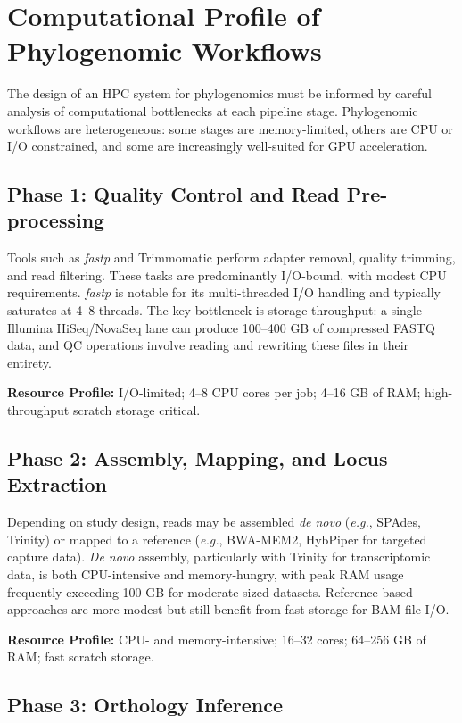 \section{Computational Profile of Phylogenomic Workflows}

The design of an HPC system for phylogenomics must be informed by careful analysis of computational bottlenecks at each pipeline stage. Phylogenomic workflows are heterogeneous: some stages are memory-limited, others are CPU or I/O constrained, and some are increasingly well-suited for GPU acceleration.

\subsection{Phase 1: Quality Control and Read Pre-processing}

Tools such as \textit{fastp} \parencite{chen2018} and Trimmomatic \parencite{bolger2014} perform adapter removal, quality trimming, and read filtering. These tasks are predominantly I/O-bound, with modest CPU requirements. \textit{fastp} is notable for its multi-threaded I/O handling and typically saturates at 4--8 threads. The key bottleneck is storage throughput: a single Illumina HiSeq/NovaSeq lane can produce 100--400 GB of compressed FASTQ data, and QC operations involve reading and rewriting these files in their entirety.

\textbf{Resource Profile:} I/O-limited; 4--8 CPU cores per job; 4--16 GB of RAM; high-throughput scratch storage critical.

\subsection{Phase 2: Assembly, Mapping, and Locus Extraction}

Depending on study design, reads may be assembled \textit{de novo} (\textit{e.g.}, SPAdes, Trinity) or mapped to a reference (\textit{e.g.}, BWA-MEM2, HybPiper for targeted capture data). \textit{De novo} assembly, particularly with Trinity for transcriptomic data, is both CPU-intensive and memory-hungry, with peak RAM usage frequently exceeding 100 GB for moderate-sized datasets. Reference-based approaches are more modest but still benefit from fast storage for BAM file I/O.

\textbf{Resource Profile:} CPU- and memory-intensive; 16--32 cores; 64--256 GB of RAM; fast scratch storage.

\subsection{Phase 3: Orthology Inference}

